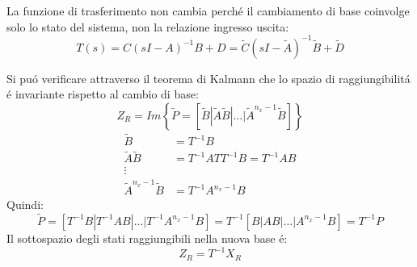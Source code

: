 \documentclass[../main.tex]{subfiles}
\begin{document}
		La funzione di trasferimento non cambia perch\'e il cambiamento di base coinvolge solo lo stato del sistema, non la relazione ingresso uscita:
		\[ 
			T(s) = C(sI-A)^{-1}B+D = \tilde C (sI-\tilde A)^{-1} \tilde B + \tilde D
		\]
		
		Si pu\'o verificare attraverso il teorema di Kalmann che lo spazio di raggiungibilit\'a \'e invariante rispetto al cambio di base:
		\[ 
			Z_R = Im\left\lbrace \tilde P = \left[ \tilde B | \tilde A \tilde B | \dots | \tilde A^{n_x-1} \tilde B \right] \right\rbrace
		\]
		\begin{align*}
			\tilde B &= T^{-1} B
			\\
			\tilde A \tilde B &= T^{-1}AT T^{-1}B = T^{-1}AB
			\\\vdots\\
			\tilde A^{n_x-1} \tilde B &= T^{-1}A^{n_x-1}B
		\end{align*}
		Quindi:
		\[
			\tilde P = \left[ T^{-1} B | T^{-1} AB | \dots | T^{-1} A^{n_x-1}B \right] = T^{-1} \left[ B | AB | \dots | A^{n_x-1}B \right] = T^{-1}P
		\]
		Il sottospazio degli stati raggiungibili nella nuova base \'e:
		\[
			Z_R = T^{-1} X_R
		\]
		
\end{document}

